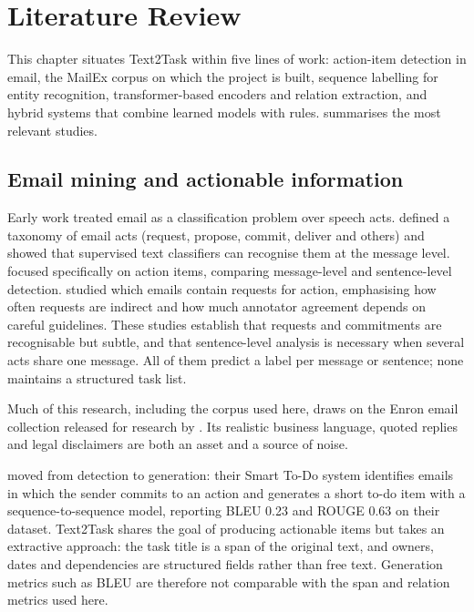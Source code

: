 \chapter{Literature Review}
\label{ch:literature}

This chapter situates Text2Task within five lines of work: action-item detection in email, the MailEx corpus on which the project is built, sequence labelling for entity recognition, transformer-based encoders and relation extraction, and hybrid systems that combine learned models with rules.  summarises the most relevant studies.

\section{Email mining and actionable information}
Early work treated email as a classification problem over speech acts. \citet{cohen2004speechacts} defined a taxonomy of email acts (request, propose, commit, deliver and others) and showed that supervised text classifiers can recognise them at the message level. \citet{bennett2005actionitems} focused specifically on action items, comparing message-level and sentence-level detection. \citet{lampert2010requests} studied which emails contain requests for action, emphasising how often requests are indirect and how much annotator agreement depends on careful guidelines. These studies establish that requests and commitments are recognisable but subtle, and that sentence-level analysis is necessary when several acts share one message. All of them predict a label per message or sentence; none maintains a structured task list.

Much of this research, including the corpus used here, draws on the Enron email collection released for research by \citet{klimt2004enron}. Its realistic business language, quoted replies and legal disclaimers are both an asset and a source of noise.

\citet{mukherjee2020smarttodo} moved from detection to generation: their Smart To-Do system identifies emails in which the sender commits to an action and generates a short to-do item with a sequence-to-sequence model, reporting BLEU 0.23 and ROUGE 0.63 on their dataset. Text2Task shares the goal of producing actionable items but takes an extractive approach: the task title is a span of the original text, and owners, dates and dependencies are structured fields rather than free text. Generation metrics such as BLEU are therefore not comparable with the span and relation metrics used here.

